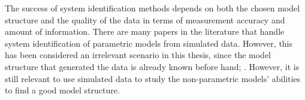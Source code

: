 The success of system identification methods depends on both the chosen model structure and the quality of the data in terms of measurement accuracy and amount of information. 
There are many papers in the literature that handle system identification of parametric models from simulated data. However, this has been considered an irrelevant scenario in this thesis, since the model structure that generated the data is already known before hand;  \cite{millerShipModelIdentification2021}. However, it is still relevant to use simulated data to study the non-parametric models' abilities to find a good model structure.


